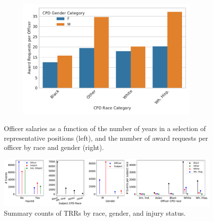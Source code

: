 \begin{figure}[t!] 
\begin{subfigure}{0.43\textwidth}
\end{subfigure}
\begin{subfigure}{0.53\textwidth}
\includegraphics[width=\textwidth]{figs/awards} 
\end{subfigure}
\caption{Officer salaries as a function of the number of years in a selection of representative positions (left),
and the number of award requests per officer by race and gender (right).} \label{fig:salary_awards}
\end{figure}
\begin{figure}[t!] 
	\includegraphics[width=\textwidth]{figs/trr_stats} 
	\caption{Summary counts of TRRs by race, gender, and injury status.} \label{fig:trrs_stats1}
\end{figure}


